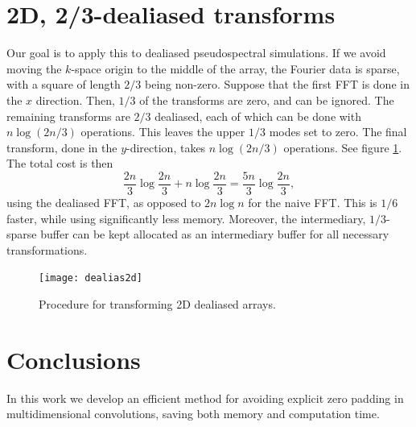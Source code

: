 \documentclass[final]{siamltex}
\def\be{\begin{dmath*}}
\def\ee{\end{dmath*}}
\begin{document}




\section{2D, 2/3-dealiased transforms}
Our goal is to apply this to dealiased pseudospectral simulations. If we 
avoid moving the $k$-space origin to the middle of the array, the Fourier
data is sparse, with a square of length $2/3$ being non-zero. Suppose that 
the first FFT is done in the $x$ direction.  Then, $1/3$ of the transforms
are zero, and can be ignored. The remaining transforms are $2/3$ dealiased,
each of which can be done with $n \log (2 n/3)$ operations. This leaves
the upper $1/3$ modes set to zero.  The final transform, done in the 
$y$-direction, takes $n \log(2 n/3)$ operations.  See figure \ref{dealias2d}.
The total cost is then
\be
\frac{2 n}{3} \log \frac{2 n}{3} +  n \log \frac{2 n}{3}
=\frac{5n}{3} \log \frac{2 n}{3},
\ee
using the dealiased FFT, as opposed to $2 n \log n$ for the naive FFT. This 
is $1/6$ faster, while using significantly less memory. Moreover, the
intermediary, $1/3$-sparse buffer can be kept allocated as an intermediary
buffer for all necessary transformations.
\begin{figure}[htbp]
  \begin{center}
    \texttt{[image: dealias2d]}
    \caption{Procedure for transforming 2D dealiased arrays.}
    \label{dealias2d}
  \end{center}
\end{figure}

\section{Conclusions}
In this work we develop an efficient method for avoiding explicit zero
padding in multidimensional convolutions, saving both memory and
computation time.
\end{document}

